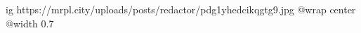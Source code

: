  
 
 
 
 

\ifcmt
  ig https://mrpl.city/uploads/posts/redactor/pdg1yhedcikqgtg9.jpg
  @wrap center
  @width 0.7
\fi
